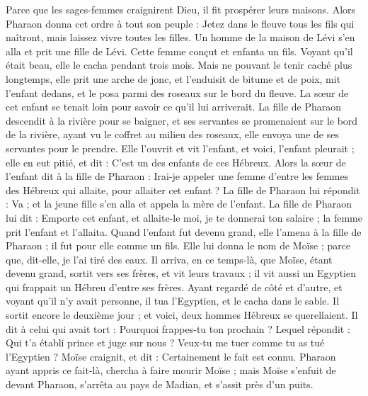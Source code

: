 \begin{multicols}{2}
Parce que les sages-femmes craignirent Dieu, il fit prospérer leurs maisons.
Alors Pharaon donna cet ordre à tout son peuple : Jetez dans le fleuve tous les fils qui naîtront, mais laissez vivre toutes les filles.
\VerseOne{}Un homme de la maison de Lévi s'en alla et prit une fille de Lévi.
Cette femme conçut et enfanta un fils. Voyant qu'il était beau, elle le cacha pendant trois mois.
Mais ne pouvant le tenir caché plus longtemps, elle prit une arche de jonc, et l'enduisit de bitume et de poix, mit l'enfant dedans, et le posa parmi des roseaux sur le bord du fleuve.
La sœur de cet enfant se tenait loin pour savoir ce qu'il lui arriverait.
La fille de Pharaon descendit à la rivière pour se baigner, et ses servantes se promenaient sur le bord de la rivière, ayant vu le coffret au milieu des roseaux, elle envoya une de ses servantes pour le prendre.
Elle l’ouvrit et vit l'enfant, et voici, l'enfant pleurait ; elle en eut pitié, et dit : C'est un des enfants de ces Hébreux.
Alors la sœur de l'enfant dit à la fille de Pharaon : Irai-je appeler une femme d'entre les femmes des Hébreux qui allaite, pour allaiter cet enfant ?
La fille de Pharaon lui répondit : Va ; et la jeune fille s'en alla et appela la mère de l'enfant.
La fille de Pharaon lui dit : Emporte cet enfant, et allaite-le moi, je te donnerai ton salaire ; la femme prit l'enfant et l'allaita.
Quand l'enfant fut devenu grand, elle l'amena à la fille de Pharaon ; il fut pour elle comme un fils. Elle lui donna le nom de Moïse ; parce que, dit-elle, je l'ai tiré des eaux.
Il arriva, en ce temps-là, que Moïse, étant devenu grand, sortit vers ses frères, et vit leurs travaux ; il vit aussi un Egyptien qui frappait un Hébreu d'entre ses frères.
Ayant regardé de côté et d’autre, et voyant qu'il n'y avait personne, il tua l'Egyptien, et le cacha dans le sable.
Il sortit encore le deuxième jour ; et voici, deux hommes Hébreux se querellaient. Il dit à celui qui avait tort : Pourquoi frappes-tu ton prochain ?
Lequel répondit : Qui t'a établi prince et juge sur nous ? Veux-tu me tuer comme tu as tué l'Egyptien ? Moïse craignit, et dit : Certainement le fait est connu.
Pharaon ayant appris ce fait-là, chercha à faire mourir Moïse ; mais Moïse s'enfuit de devant Pharaon, s'arrêta au pays de Madian, et s'assit près d'un puits.

\end{multicols}
